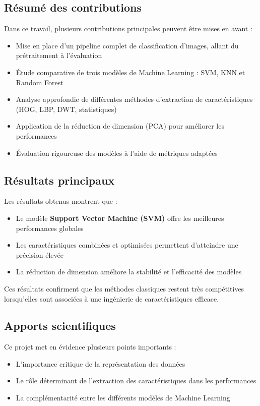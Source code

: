 \documentclass[12pt,a4paper]{article}
\begin{document}
    \subsection{Résumé des contributions}

    Dans ce travail, plusieurs contributions principales peuvent être mises en avant :
    \begin{itemize}
        \item Mise en place d’un pipeline complet de classification d’images, allant du prétraitement à l’évaluation
        \item Étude comparative de trois modèles de Machine Learning : SVM, KNN et Random Forest
        \item Analyse approfondie de différentes méthodes d’extraction de caractéristiques (HOG, LBP, DWT, statistiques)
        \item Application de la réduction de dimension (PCA) pour améliorer les performances
        \item Évaluation rigoureuse des modèles à l’aide de métriques adaptées
    \end{itemize}

    \subsection{Résultats principaux}

    Les résultats obtenus montrent que :
    \begin{itemize}
        \item Le modèle \textbf{Support Vector Machine (SVM)} offre les meilleures performances globales
        \item Les caractéristiques combinées et optimisées permettent d’atteindre une précision élevée
        \item La réduction de dimension améliore la stabilité et l’efficacité des modèles
    \end{itemize}

    Ces résultats confirment que les méthodes classiques restent très compétitives lorsqu’elles sont associées à une ingénierie de caractéristiques efficace.

    \subsection{Apports scientifiques}

    Ce projet met en évidence plusieurs points importants :
    \begin{itemize}
        \item L’importance critique de la représentation des données
        \item Le rôle déterminant de l’extraction des caractéristiques dans les performances
        \item La complémentarité entre les différents modèles de Machine Learning
    \end{itemize}
\end{document}
